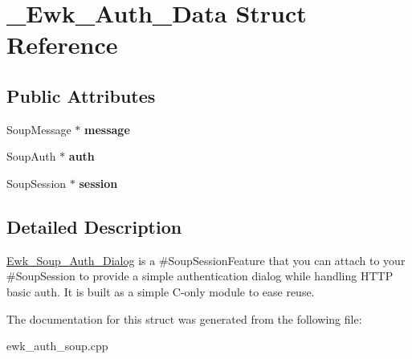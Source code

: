 \hypertarget{struct__Ewk__Auth__Data}{\section{\+\_\+\+Ewk\+\_\+\+Auth\+\_\+\+Data Struct Reference}
\label{struct__Ewk__Auth__Data}
}
\subsection*{Public Attributes}
\begin{DoxyCompactItemize}
\item 
\hypertarget{struct__Ewk__Auth__Data_a22f8d299d651013b2b92ad48d00e195e}{Soup\+Message $\ast$ {\bfseries message}}\label{struct__Ewk__Auth__Data_a22f8d299d651013b2b92ad48d00e195e}

\item 
\hypertarget{struct__Ewk__Auth__Data_a748ef5f2922233d20d7f178bc92df98d}{Soup\+Auth $\ast$ {\bfseries auth}}\label{struct__Ewk__Auth__Data_a748ef5f2922233d20d7f178bc92df98d}

\item 
\hypertarget{struct__Ewk__Auth__Data_abecd7226692b4cb333b39ca037f2484d}{Soup\+Session $\ast$ {\bfseries session}}\label{struct__Ewk__Auth__Data_abecd7226692b4cb333b39ca037f2484d}

\end{DoxyCompactItemize}


\subsection{Detailed Description}
\hyperlink{structEwk__Soup__Auth__Dialog}{Ewk\+\_\+\+Soup\+\_\+\+Auth\+\_\+\+Dialog} is a \#\+Soup\+Session\+Feature that you can attach to your \#\+Soup\+Session to provide a simple authentication dialog while handling H\+T\+T\+P basic auth. It is built as a simple C-\/only module to ease reuse. 

The documentation for this struct was generated from the following file\+:\begin{DoxyCompactItemize}
\item 
ewk\+\_\+auth\+\_\+soup.\+cpp\end{DoxyCompactItemize}
